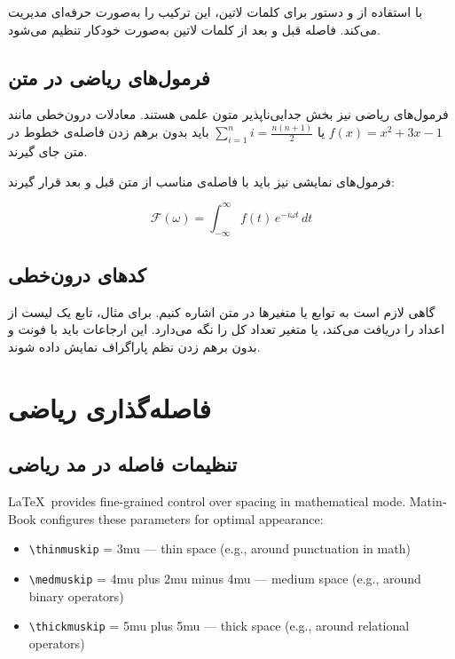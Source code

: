 \documentclass{matinbook}
\begin{document}
 با استفاده از  و دستور
 برای کلمات لاتین، این ترکیب را
به‌صورت حرفه‌ای مدیریت می‌کند. فاصله قبل و بعد از کلمات
لاتین به‌صورت خودکار تنظیم می‌شود.

\section{فرمول‌های ریاضی در متن}
\label{sec:typography-math-inline}

فرمول‌های ریاضی نیز بخش جدایی‌ناپذیر متون علمی هستند.
معادلات درون‌خطی مانند $f(x) = x^{2} + 3x - 1$ یا
$\sum_{i=1}^{n} i = \frac{n(n+1)}{2}$ باید بدون برهم
زدن فاصله‌ی خطوط در متن جای گیرند.

فرمول‌های نمایشی نیز باید با فاصله‌ی مناسب از متن قبل و
بعد قرار گیرند:

\[
    \mathcal{F}(\omega) = \int_{-\infty}^{\infty} f(t) \, e^{-i\omega t} \, dt
\]

\section{کدهای درون‌خطی}
\label{sec:typography-inline-code}

گاهی لازم است به توابع یا متغیرها در متن اشاره کنیم.
برای مثال، تابع  یک لیست
از اعداد را دریافت می‌کند، یا متغیر 
تعداد کل را نگه می‌دارد. این ارجاعات باید با فونت
 و بدون برهم زدن نظم پاراگراف نمایش داده شوند.

\chapter{فاصله‌گذاری ریاضی}
\label{chap:typography-math}

\section{تنظیمات فاصله در مد ریاضی}
\label{sec:typography-math-spacing}

\begin{latin}
\LaTeX\ provides fine-grained control over spacing in
mathematical mode. MatinBook configures these parameters for
optimal appearance:

\begin{itemize}
    \item \texttt{\textbackslash thinmuskip} = 3mu --- thin space
    (e.g., around punctuation in math)
    \item \texttt{\textbackslash medmuskip} = 4mu plus 2mu minus 4mu
    --- medium space (e.g., around binary operators)
    \item \texttt{\textbackslash thickmuskip} = 5mu plus 5mu
    --- thick space (e.g., around relational operators)
\end{itemize}
\end{latin}
\end{document}
